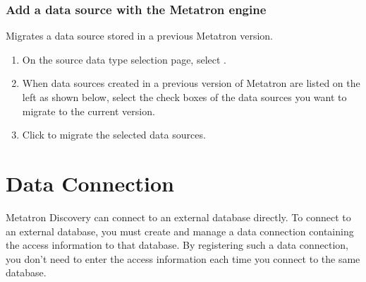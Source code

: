 \documentclass[letterpaper,10pt,english]{sphinxmanual}
\begin{document}
\subsubsection{Add a data source with the Metatron engine}
\label{\detokenize{discovery/part02/create_a_data_source:metatron}}\label{\detokenize{discovery/part02/create_a_data_source:create-datasource-from-metatron}}
Migrates a data source stored in a previous Metatron version.
\begin{enumerate}
\def\theenumi{\arabic{enumi}}
\def\labelenumi{\theenumi .}
\makeatletter\def\p@enumii{\p@enumi \theenumi .}\makeatother
\item {} 
On the source data type selection page, select .

\item {} 
When data sources created in a previous version of Metatron are listed on the left as shown below, select the check boxes of the data sources you want to migrate to the current version.
\begin{quote}

\begin{figure}[H]
\centering

\noindent{}
\end{figure}
\end{quote}

\item {} 
Click  to migrate the selected data sources.
\begin{quote}

\begin{figure}[H]
\centering

\noindent{}
\end{figure}
\end{quote}

\end{enumerate}


\section{Data Connection}
\label{\detokenize{discovery/part02/data_connection:id1}}\label{\detokenize{discovery/part02/data_connection::doc}}
Metatron Discovery can connect to an external database directly. To connect to an external database, you must create and manage a data connection containing the access information to that database. By registering such a data connection, you don’t need to enter the access information each time you connect to the same database.
\end{document}
